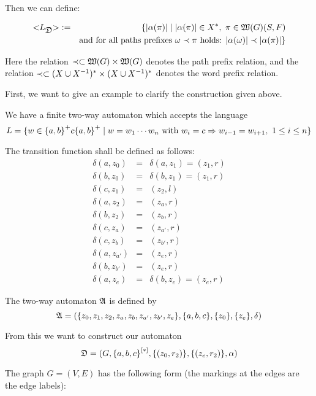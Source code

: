 Then we can define:

\begin{definition}
\begin{eqnarray*}
\mbox{${<}{L_{\mbox{$\mathfrak{D}$}}}{>}$} &:=& \{ |\alpha(\pi)| \mid  |\alpha(\pi)| \in
X^*,\ \pi \in \mbox{$\mathfrak{W}({G})$}(S, F) \\
&& \text{and for all paths prefixes }\omega \prec \pi \text{ holds: }
|\alpha(\omega)| \prec |\alpha(\pi)| \}
\end{eqnarray*}

Here the relation $\prec \subset \mbox{$\mathfrak{W}({G})$} \times \mbox{$\mathfrak{W}({G})$}$ denotes the
path prefix relation, and the relation $\prec \subset (X \cup {X}^{-1})^* \times
(X \cup {X}^{-1})^*$ denotes the word prefix relation.
\end{definition}

\bigskip
First, we want to give an example to clarify the construction given above.

We have a finite two-way automaton which accepts the language
\[ L = \mbox{$\{w \in \mbox{$\{a, b\}$}^+ c \mbox{$\{a, b\}$}^+ \mid w = w_1 \cdots w_n
\text{ with } w_i = c \Rightarrow w_{i-1} = w_{i+1},\ 1 \leq i \leq n\}$} \]

The transition function shall be defined as follows:
\begin{eqnarray*}
\delta(a, z_0) &=& \delta(a, z_1) = (z_1, r) \\
\delta(b, z_0) &=& \delta(b, z_1) = (z_1, r) \\
\delta(c, z_1) &=& (z_2, l) \\
\delta(a, z_2) &=& (z_a, r) \\
\delta(b, z_2) &=& (z_b, r) \\
\delta(c, z_a) &=& (z_{a'}, r) \\
\delta(c, z_b) &=& (z_{b'}, r) \\
\delta(a, z_{a'}) &=& (z_e, r) \\
\delta(b, z_{b'}) &=& (z_e, r) \\
\delta(a, z_{e}) &=& \delta(b, z_e) = (z_e, r)
\end{eqnarray*}

The two-way automaton $\mbox{$\mathfrak{A}$}$ is defined by
\[ \mbox{$\mathfrak{A}$} = (\mbox{$\{z_0, z_1, z_2, z_a, z_b, z_{a'}, z_{b'}, z_e\}$}, \mbox{$\{a,
b, c\}$}, \mbox{$\{z_0\}$}, \mbox{$\{z_e\}$}, \delta) \]

From this we want to construct our automaton 
\[ \mbox{$\mathfrak{D}$} = (G, \mbox{${\mbox{$\{a, b, c\}$}}^{[*]}$}, \mbox{$\{(z_0, r_2)\}$}, \mbox{$\{(z_e,
r_2)\}$}, \alpha) \]

The graph $G = (V, E)$ has the following form (the markings at the edges are
the edge labels):

